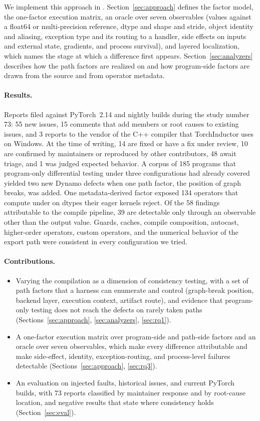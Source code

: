 We implement this approach in \tool. Section~\ref{sec:approach} defines the factor model, the one-factor
execution matrix, an oracle over seven observables (values against a float64 or multi-precision reference,
dtype and shape and stride, object identity and aliasing, exception type and its routing to a handler, side
effects on inputs and external state, gradients, and process survival), and layered localization, which names
the stage at which a difference first appears. Section~\ref{sec:analyzers} describes how the path factors are
realized on \tcompile and how program-side factors are drawn from the source and from operator metadata.

\paragraph{Results.} Reports filed against PyTorch~2.14 and nightly builds during the study number 73: 55 new
issues, 15 comments that add members or root causes to existing issues, and 3 reports to the vendor of the C++
compiler that TorchInductor uses on Windows. At the time of writing, 14 are fixed or have a fix under review, 10
are confirmed by maintainers or reproduced by other contributors, 48 await triage, and 1 was judged expected
behavior. A corpus of 185 programs that program-only differential testing under three configurations had already
covered yielded two new Dynamo defects when one path factor, the position of graph breaks, was added. One
metadata-derived factor exposed 134 operators that compute under \tcompile on dtypes their eager kernels
reject. Of the 58 findings attributable to the compile pipeline, 39 are detectable only through an observable
other than the output value. Guards, caches, compile composition, autocast, higher-order operators, custom
operators, and the numerical behavior of the export path were consistent in every configuration we tried.

\paragraph{Contributions.}
\begin{itemize}
  \item Varying the compilation as a dimension of consistency testing, with a set of path factors that a
        harness can enumerate and control (graph-break position, backend layer, execution context, artifact
        route), and evidence that program-only testing does not reach the defects on rarely taken paths
        (Sections~\ref{sec:approach}, \ref{sec:analyzers}, \ref{sec:rq1}).
  \item A one-factor execution matrix over program-side and path-side factors and an oracle over seven
        observables, which make every difference attributable and make side-effect, identity,
        exception-routing, and process-level failures detectable (Sections~\ref{sec:approach}, \ref{sec:rq3}).
  \item An evaluation on injected faults, historical issues, and current PyTorch builds, with 73 reports
        classified by maintainer response and by root-cause location, and negative results that state where
        consistency holds (Section~\ref{sec:eval}).
\end{itemize}
